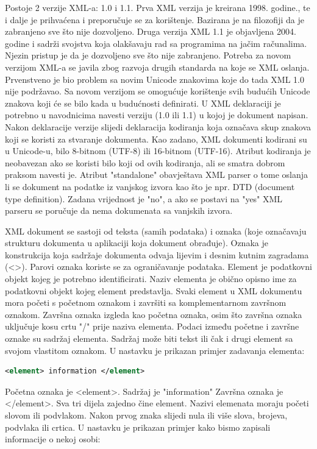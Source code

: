 \documentclass{foi}
\begin{document}
Postoje 2 verzije XML-a: 1.0 i 1.1. Prva XML verzija je kreirana 1998. godine., te i dalje je prihvaćena i preporučuje se za korištenje. Bazirana je na filozofiji da je zabranjeno sve što nije dozvoljeno. Druga verzija XML 1.1 je objavljena 2004. godine i sadrži svojstva koja olakšavaju rad sa programima na jačim računalima. Njezin pristup je da je dozvoljeno sve što nije zabranjeno. Potreba za novom verzijom XML-a se javila zbog razvoja drugih standarda na koje se XML oslanja. Prvenstveno je bio problem sa novim Unicode znakovima koje do tada XML 1.0 nije podržavao. Sa novom verzijom se omogućuje korištenje svih budućih Unicode znakova koji će se bilo kada u budućnosti definirati. U XML deklaraciji je potrebno u navodnicima navesti verziju (1.0 ili 1.1) u kojoj je dokument napisan. Nakon deklaracije verzije slijedi deklaracija kodiranja koja označava skup znakova koji se koristi za stvaranje dokumenta. Kao zadano, XML dokumenti kodirani su u Unicode-u, bilo 8-bitnom (UTF-8) ili 16-bitnom (UTF-16). Atribut kodiranja je neobavezan ako se koristi bilo koji od ovih kodiranja, ali se smatra dobrom praksom navesti je.  Atribut "standalone" obavještava XML parser o tome oslanja li se dokument na podatke iz vanjskog izvora kao što je npr. DTD (document type definition). Zadana vrijednost je "no", a ako se postavi na "yes" XML parseru se poručuje da nema dokumenata sa vanjskih izvora.

XML dokument se sastoji od teksta (samih podataka) i oznaka (koje označavaju strukturu dokumenta u aplikaciji koja dokument obrađuje). Oznaka je konstrukcija koja sadržaje dokumenta odvaja lijevim i desnim kutnim zagradama (<>). Parovi oznaka koriste se za ograničavanje podataka. Element je podatkovni objekt kojeg je potrebno identificirati. Naziv elementa je obično opisno ime za podatkovni objekt kojeg element predstavlja. Svaki element u XML dokumentu mora početi s početnom oznakom i završiti sa komplementarnom završnom oznakom. Završna oznaka izgleda kao početna oznaka, osim što završna oznaka uključuje kosu crtu "/" prije naziva elementa. Podaci između početne i završne oznake su sadržaj elementa. Sadržaj može biti tekst ili čak i drugi element sa svojom vlastitom oznakom. U nastavku je prikazan primjer zadavanja elementa:

\begin{lstlisting}[language=XML]
<element> information </element>
\end{lstlisting}

Početna oznaka je <element>. Sadržaj je "information" Završna oznaka je </element>. Sva tri dijela zajedno čine element. Nazivi elemenata moraju početi slovom ili podvlakom. Nakon prvog znaka slijedi nula ili više slova, brojeva, podvlaka ili crtica. \cite{xmlSoapProgramming} U nastavku je prikazan primjer kako bismo zapisali informacije o nekoj osobi:
\end{document}
